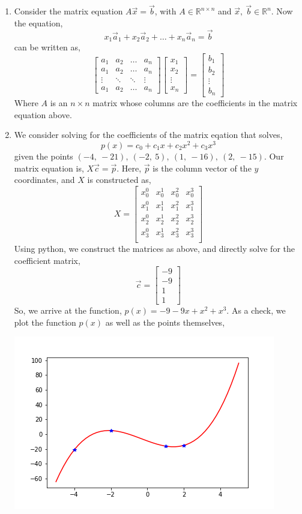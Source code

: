 \documentclass[letterpaper,10pt]{article}
\newcommand{\R}{\mathbb{R}}
\begin{document}
\begin{enumerate}
\item Consider the matrix equation $A\vec{x}=\vec{b}$, with $A\in \R^{n\times n}$ and $\vec{x},\ \vec{b}\in \R^n$. Now the equation,
\[x_1\vec{a}_1+x_2\vec{a}_2+\ldots +x_n\vec{a}_n=\vec{b} \]
can be written as,
\[\begin{bmatrix}
a_1 & a_2 & \ldots & a_n\\
a_1 & a_2 & \ldots & a_n\\
\vdots & \ddots & \ddots & \vdots\\
a_1 & a_2 & \ldots & a_n
\end{bmatrix} \begin{bmatrix}
x_1\\x_2\\ \vdots\\ x_n
\end{bmatrix}=\begin{bmatrix}
b_1\\ b_2\\ \vdots \\ b_n
\end{bmatrix} \]
Where $A$ is an $n\times n$ matrix whose columns are the coefficients in the matrix equation above.
\item We consider solving for the coefficients of the matrix eqation that solves, 
\[p(x)=c_0+c_1x+c_2x^2+c_3x^3\]
given the points $(-4,\ -21),\ (-2,\ 5),\ (1,\ -16),\ (2,\ -15)$. Our matrix equation is, $X\vec{c}=\vec{p}$. Here, $\vec{p}$ is the column vector of the $y$ coordinates, and $X$ is constructed as,
\[X=\begin{bmatrix}
x_0^0 & x_0^1 & x_0^2 & x_0^3\\
x_1^0 & x_1^1 & x_1^2 & x_1^3\\
x_2^0 & x_2^1 & x_2^2 & x_2^3\\
x_3^0 & x_3^1 & x_3^2 & x_3^3\\
\end{bmatrix} \]
Using python, we construct the matrices as above, and directly solve for the coefficient matrix,
\[\vec{c}=\begin{bmatrix}
-9\\-9\\1\\1
\end{bmatrix} \]
So, we arrive at the function, $p(x)=-9-9x+x^2+x^3$. As a check, we plot the function $p(x)$ as well as the points themselves,
\begin{center}
\includegraphics[scale=.7]{2.png}

\end{center}
\end{enumerate}
\end{document}
